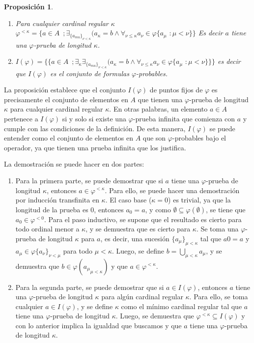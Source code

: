 \documentclass[executivepaper]{article}
\newtheorem{propo}{Proposición}[section]
\begin{document}
\begin{propo}
    \begin{enumerate}
        \item Para cualquier cardinal regular $\kappa$\\
        $\varphi^{<\kappa}=\{a\in A \,\,\,; \exists_{\{a_{mu}\}_{\nu<\kappa}}(a_{\kappa} =b \land \forall_{\nu\leq\kappa}a_{\nu}\in\varphi\{a_{\mu}\,\,:\mu<\nu\}\}$ Es decir $a$ tiene una $\varphi$-prueba de longitud $\kappa$.
        \item $I(\varphi)=\{\{a\in A \,\,\,; \exists_{\kappa}\exists_{\{a_{mu}\}_{\nu<\kappa}}(a_{\kappa} = b \land \forall_{\nu\leq\kappa}a_{\nu}\in\varphi\{a_{\mu}\,\,:\mu<\nu\}\}\}$ es decir que $I(\varphi)$ es el conjunto de formulas $\varphi$-probables.
    \end{enumerate}
\end{propo}
La proposición establece que el conjunto $I(\varphi)$ de puntos fijos de $\varphi$ es precisamente el conjunto de elementos en $A$ que tienen una $\varphi$-prueba de longitud $\kappa$ para cualquier cardinal regular $\kappa$. En otras palabras, un elemento $a\in A$ pertenece a $I(\varphi)$ si y solo si existe una $\varphi$-prueba infinita que comienza con $a$ y cumple con las condiciones de la definición. De esta manera, $I(\varphi)$ se puede entender como el conjunto de elementos en $A$ que son $\varphi$-probables bajo el operador, ya que tienen una prueba infinita que los justifica.

La demostración se puede hacer en dos partes:
\begin{enumerate}
    \item Para la primera parte, se puede demostrar que si $a$ tiene una $\varphi$-prueba de longitud $\kappa$, entonces $a \in \varphi^{<\kappa}$. Para ello, se puede hacer una demostración por inducción transfinita en $\kappa$. El caso base ($\kappa = 0$) es trivial, ya que la longitud de la prueba es 0, entonces $a_{0} = a$, y como $\emptyset \subseteq \varphi(\emptyset)$, se tiene que $a_{0} \in \varphi^{<0}$. Para el paso inductivo, se supone que el resultado es cierto para todo ordinal menor a $\kappa$, y se demuestra que es cierto para $\kappa$. Se toma una $\varphi$-prueba de longitud $\kappa$ para $a$, es decir, una sucesión $\{a_{\mu}\}_{\mu<\kappa}$ tal que $a{0} = a$ y $a_{\mu} \in \varphi\{a_{\nu}\}_{\nu<\mu}$ para todo $\mu<\kappa$. Luego, se define $b = \bigcup_{\mu<\kappa} a_{\mu}$, y se demuestra que $b \in \varphi({a_{\mu}}_{\mu<\kappa})$ y que $a \in \varphi^{<\kappa}$.
    
    \item Para la segunda parte, se puede demostrar que si $a \in I(\varphi)$, entonces $a$ tiene una $\varphi$-prueba de longitud $\kappa$ para algún cardinal regular $\kappa$. Para ello, se toma cualquier $a \in I(\varphi)$, y se define $\kappa$ como el mínimo cardinal regular tal que $a$ tiene una $\varphi$-prueba de longitud $\kappa$. Luego, se demuestra que $\varphi^{<\kappa} \subseteq I(\varphi)$ y con lo anterior implica la igualdad que buscamos y que $a$ tiene una $\varphi$-prueba de longitud $\kappa$.
\end{enumerate}
\end{document}
